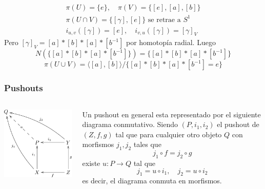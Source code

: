 \documentclass[xetex,mathserif,serif]{beamer}
\begin{document}
\begin{frame}
\begin{center}
    \end{center}
    \pause
    \begin{gather*}
      \pi (U) = \{e\}, \quad \pi (V) = \{[e], [a], [b]\} \\
      \pi (U \cap V) = \{[\gamma], [e]\} \text{ se retrae a } S^1 \\
      i_{u,v} ([\gamma]) = [e], \quad i_{v,u} ([\gamma]) = [\gamma]_V
    \end{gather*}
    Pero \([\gamma]_{V} = [a]*[b]*[a]*[b^{-1}] \) por homotopía
    radial. Luego
    \[ N \left( \{[a]*[b]*[a]*[b^{-1}]\} \right) = \{[a]*[b]*[a]*[b^{-1}]\} \]
    \[ \pi (U \cup V) = \langle [a], [b] \rangle /
      \{[a]*[b]*[a]*[b^{-1}] = e\}\]
  \end{frame}

  \begin{frame}
    \frametitle{Pushouts}
    \begin{columns}
      \begin{column}{0.35\textwidth}
        \begin{flushleft}
          \includegraphics[scale=0.9]{../tesis/imagenes/pushout.png}
        \end{flushleft}
      \end{column}
      \begin{column}{0.65\textwidth}
        Un pushout en general esta representado por el siguiente
        diagrama conmutativo.
        Siendo \((P, i_1, i_2)\) el pushout de \((Z, f, g) \) tal que
        para cualquier otro objeto \(Q\) con morfismos \(j_1, j_2\)
        tales que \[ j_1 \circ f = j_2 \circ g \]
        existe \(u : P \to Q\) tal que
        \[ j_1 = u \circ i_1,\quad j_2 = u \circ i_2 \]
        es decir, el diagrama conmuta en morfismos.
      \end{column}
    \end{columns}
  \end{frame}
\end{document}
